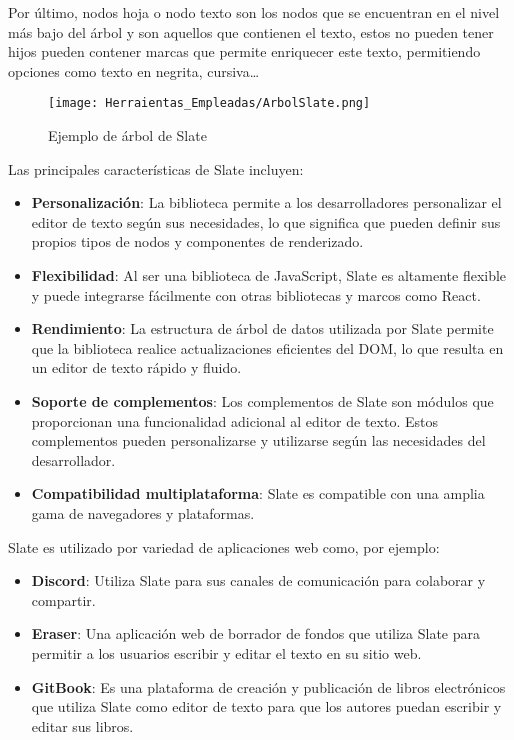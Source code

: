 Por último, nodos hoja o nodo texto son los nodos que se encuentran en el nivel más bajo del árbol y son aquellos que contienen el texto, estos no pueden tener hijos pueden contener marcas que permite enriquecer este texto, permitiendo opciones como texto en negrita, cursiva…

\begin{figure}[ht!]
  \centering
  \texttt{[image: Herraientas\_Empleadas/ArbolSlate.png]}
  \caption{Ejemplo de árbol de Slate}
  \label{fig:arbolSlate}
\end{figure}

Las principales características de Slate incluyen:

\begin{itemize}
  \item \textbf{Personalización}: La biblioteca permite a los desarrolladores personalizar el editor de texto según sus necesidades, lo que significa que pueden definir sus propios tipos de nodos y componentes de renderizado.
  \item \textbf{Flexibilidad}: Al ser una biblioteca de JavaScript, Slate es altamente flexible y puede integrarse fácilmente con otras bibliotecas y marcos como React.
  \item \textbf{Rendimiento}: La estructura de árbol de datos utilizada por Slate permite que la biblioteca realice actualizaciones eficientes del DOM, lo que resulta en un editor de texto rápido y fluido.
  \item \textbf{Soporte de complementos}: Los complementos de Slate son módulos que proporcionan una funcionalidad adicional al editor de texto. Estos complementos pueden personalizarse y utilizarse según las necesidades del desarrollador.
  \item \textbf{Compatibilidad multiplataforma}: Slate es compatible con una amplia gama de navegadores y plataformas.
\end{itemize}

Slate es utilizado por variedad de aplicaciones web como, por ejemplo:
\begin{itemize}
  \item \textbf{Discord}: Utiliza Slate para sus canales de comunicación para colaborar y compartir.
  \item \textbf{Eraser}: Una aplicación web de borrador de fondos que utiliza Slate para permitir a los usuarios escribir y editar el texto en su sitio web.
  \item \textbf{GitBook}: Es una plataforma de creación y publicación de libros electrónicos que utiliza Slate como editor de texto para que los autores puedan escribir y editar sus libros.
\end{itemize}


